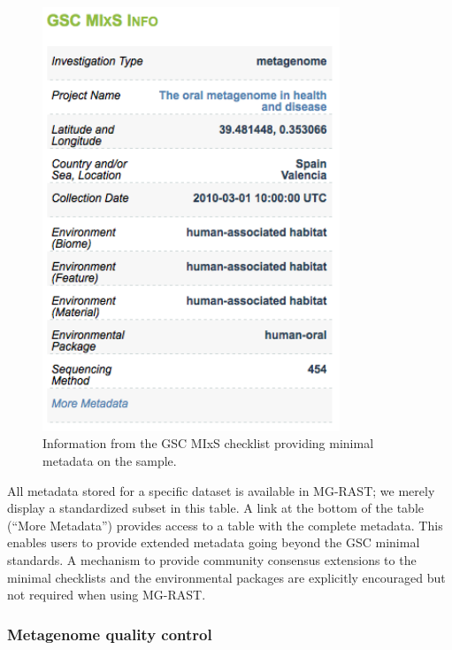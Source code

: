 \documentclass[12pt,fullpage]{report}
\begin{document}
\begin{figure}
\begin{center}
\includegraphics[width=3.5in]{Images/GSC-MIxS-checklist-information.png}
\end{center}
\caption{
Information from the GSC MIxS checklist providing minimal metadata on the sample.
}
\label{fig:GSC-MIxS-checklist-information}
\end{figure}

All metadata stored for a specific dataset is available in MG-RAST; we merely display a standardized subset in this table. A link at the bottom of the table (``More Metadata'') provides access to a table with the complete metadata. This enables users to provide extended metadata going beyond the GSC minimal standards. A mechanism to provide community consensus extensions to the minimal checklists and the environmental packages are explicitly encouraged but not required when using MG-RAST.
\subsubsection{Metagenome quality control}
\end{document}
